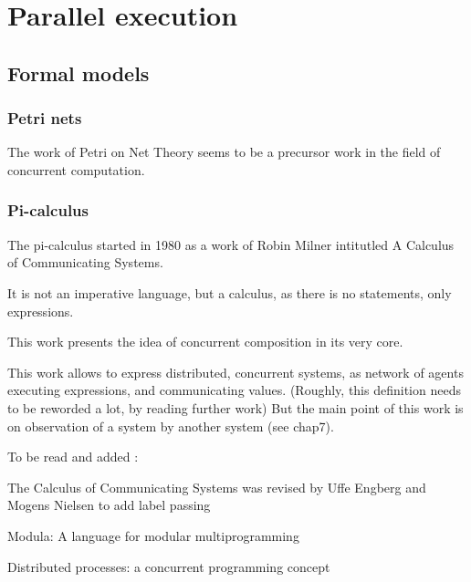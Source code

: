 \section{Parallel execution}


\subsection{Formal models}

\subsubsection{Petri nets}

The work of Petri on Net Theory seems to be a precursor work in the field of concurrent computation.

\subsubsection{Pi-calculus}

The pi-calculus started in 1980 as a work of Robin Milner intitutled A Calculus of Communicating Systems\cite{Milner1980}.

It is not an imperative language, but a calculus, as there is no statements, only expressions.

This work presents the idea of concurrent composition in its very core.

This work allows to express distributed, concurrent systems, as network of agents executing expressions, and communicating values.
(Roughly, this definition needs to be reworded a lot, by reading further work)
But the main point of this work is on observation of a system by another system (see chap7).



To be read and added :

The Calculus of Communicating Systems was revised by Uffe Engberg and Mogens Nielsen to add label passing \cite{Engberg1986}

Modula: A language for modular multiprogramming \cite{Wirth1977}

Distributed processes: a concurrent programming concept \cite{Hansen1978}

